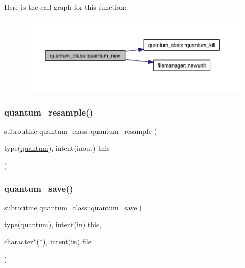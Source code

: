 Here is the call graph for this function\+:\nopagebreak
\begin{figure}[H]
\begin{center}
\leavevmode
\includegraphics[width=350pt]{namespacequantum__class_a3170f42702712b16bcc152509752f18e_cgraph}
\end{center}
\end{figure}
\mbox{\label{namespacequantum__class_a496266b0eb772dd0e7d8ce9d8439945a}} 
\subsubsection{\texorpdfstring{quantum\+\_\+resample()}{quantum\_resample()}}
{\footnotesize\ttfamily subroutine quantum\+\_\+class\+::quantum\+\_\+resample (\begin{DoxyParamCaption}\item[{type(\hyperlink{structquantum__class_1_1quantum}{quantum}), intent(inout)}]{this }\end{DoxyParamCaption})\hspace{0.3cm}{\ttfamily [private]}}

\mbox{\label{namespacequantum__class_aa60138cf5e19494d1f29b63053b32f24}} 
\subsubsection{\texorpdfstring{quantum\+\_\+save()}{quantum\_save()}}
{\footnotesize\ttfamily subroutine quantum\+\_\+class\+::quantum\+\_\+save (\begin{DoxyParamCaption}\item[{type(\hyperlink{structquantum__class_1_1quantum}{quantum}), intent(in)}]{this,  }\item[{character$\ast$($\ast$), intent(in)}]{file }\end{DoxyParamCaption})\hspace{0.3cm}{\ttfamily [private]}}

